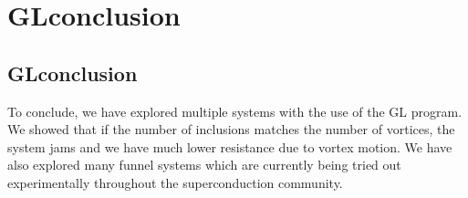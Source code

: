 \chapter{GLconclusion}          %
\label{codechap}
\section{GLconclusion}

To conclude, we have explored multiple systems with the use of the GL program. We showed that if the number of inclusions matches the number of vortices, the system jams and we have much lower resistance due to vortex motion. We have also explored many funnel systems which are currently being tried out experimentally throughout the superconduction community. 

